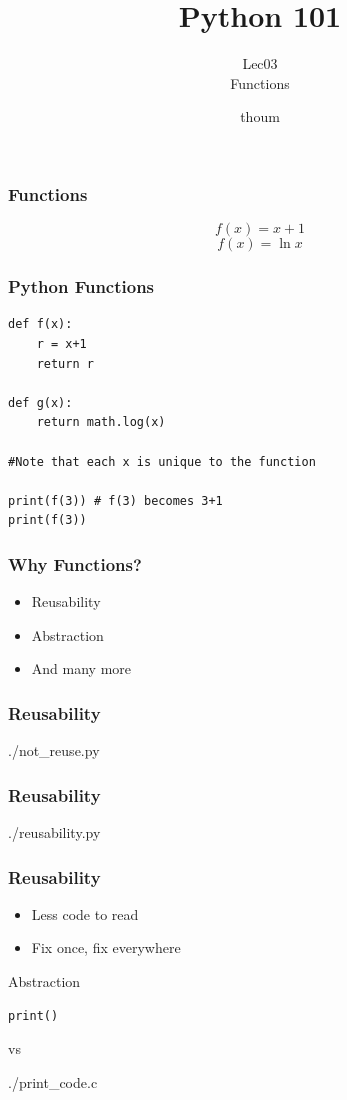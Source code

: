 \documentclass{beamer}
\title{Python 101}
\subtitle{Lec03 \\ Functions}
\author{thoum}
\begin{document}
\frame{\titlepage}

\begin{frame}
\frametitle{Functions}
  $$f(x) = x+1$$
  $$f(x) = \ln x$$
\end{frame}

\begin{frame}[fragile]
\frametitle{Python Functions}
\begin{lstlisting}
def f(x):
    r = x+1
    return r

def g(x):
    return math.log(x)

#Note that each x is unique to the function

print(f(3)) # f(3) becomes 3+1
print(f(3))
\end{lstlisting}
\end{frame}
\begin{frame}
\frametitle{Why Functions?}
  \begin{itemize}
    \item Reusability
    \item Abstraction
    \item And many more
  \end{itemize}
\end{frame}

\begin{frame}
\frametitle{Reusability}
  \begin{lstinputlisting}
    {./not_reuse.py}
  \end{lstinputlisting}
\end{frame}

\begin{frame}
\frametitle{Reusability}
  \begin{lstinputlisting}
    {./reusability.py}
  \end{lstinputlisting}
\end{frame}

\begin{frame}
\frametitle{Reusability}
\begin{itemize}
  \item Less code to read
  \item Fix once, fix everywhere
\end{itemize}
\end{frame}

\begin{frame}[fragile]{Abstraction}
  \begin{lstlisting}
print()
  \end{lstlisting}
  vs
  \begin{lstinputlisting}
    {./print_code.c}
  \end{lstinputlisting}
\end{frame}
\end{document}
